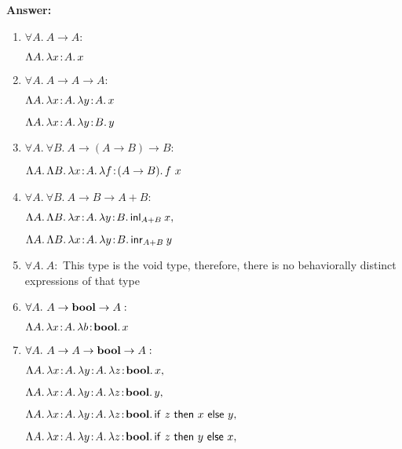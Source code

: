 \documentclass[10pt]{article}
\begin{document}
\begin{exercise}
\noindent \textbf{Answer:}
\begin{enumerate}
\item $\forall A.~ A \rightarrow A:$ 

$\Lam{A}{\lam{x\ty A}}{x}$
\item $\forall A.~ A \rightarrow A \rightarrow A:$ 

$\Lam{A}{\lam{x\ty A}{\lam{y\ty A}{x}}}$ 

$\Lam{A}{\lam{x\ty A}{\lam{y\ty B}{y}}}$
\item $\forall A.~ \forall B.~ A\rightarrow (A \rightarrow B) \rightarrow B:$ 

$\Lam{A}{\Lam{B}{\lam{x\ty A}{\lam{f\ty (A \rightarrow B)}{f~x}}}}$
\item $\forall A.~\forall B.~ A \rightarrow B \rightarrow A + B: $

$\Lam{A}{\Lam{B}{\lam{x\ty A}{\lam{y\ty B}{\inleft{A}{B}{x}}}}},$ 

$\Lam{A}{\Lam{B}{\lam{x\ty A}{\lam{y\ty B}{\inright{A}{B}{y}}}}}$
\item $\forall A.~A:$ This type is the void type, therefore, there is no behaviorally distinct expressions of that type
\item $\forall A.~ A \rightarrow \typ{bool} \rightarrow A: $

$\Lam{A}{\lam{x\ty A}{\lam{b\ty\typ{bool}}{x}}}$
\item $\forall A.~ A \rightarrow A \rightarrow \typ{bool} \rightarrow A: $

$\Lam{A}{\lam{x\ty A}{\lam{y\ty A}{\lam{z\ty \typ{bool}}{x}}}},$

$\Lam{A}{\lam{x\ty A}{\lam{y\ty A}{\lam{z\ty \typ{bool}}{y}}}},$

$\Lam{A}{\lam{x\ty A}{\lam{y\ty A}{\lam{z\ty \typ{bool}}{\cond[\lamfnt]{z}{x}{y}}}}},$

$\Lam{A}{\lam{x\ty A}{\lam{y\ty A}{\lam{z\ty \typ{bool}}{\cond[\lamfnt]{z}{y}{x}}}}},$
\end{enumerate}
\end{exercise}
\end{document}
